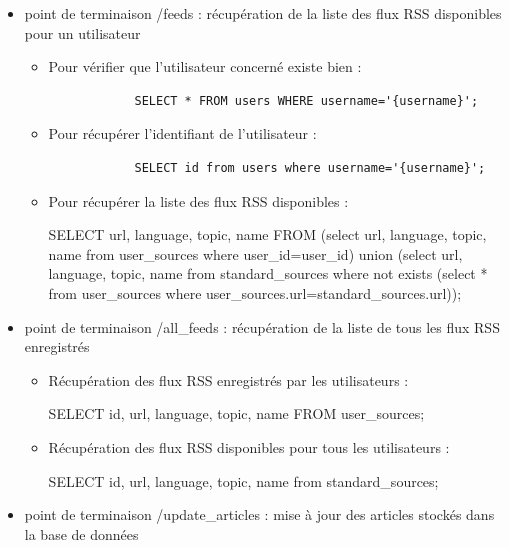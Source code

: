 \documentclass[french]{article}
\begin{document}
    \begin{itemize}
        \label{sec:query}
        \item point de terminaison /feeds : récupération de la liste des flux RSS disponibles pour un utilisateur
        \begin{itemize}
            \item Pour vérifier que l'utilisateur concerné existe bien :
            \begin{verbatim}
            SELECT * FROM users WHERE username='{username}';
            \end{verbatim}
            \item Pour récupérer l'identifiant de l'utilisateur :
            \begin{verbatim}
            SELECT id from users where username='{username}';
            \end{verbatim}
            \item Pour récupérer la liste des flux RSS disponibles :
            \begin{spverbatim}
            SELECT url, language, topic, name FROM (select url, language, topic, name from user_sources where user_id={user_id}) union  (select url, language, topic, name from standard_sources where not exists (select * from user_sources where user_sources.url=standard_sources.url));
            \end{spverbatim}
        \end{itemize}
        \item point de terminaison /all\_feeds : récupération de la liste de tous les flux RSS enregistrés
        \begin{itemize}
            \item Récupération des flux RSS enregistrés par les utilisateurs :
            \begin{spverbatim}
            SELECT id, url, language, topic, name FROM user_sources;
            \end{spverbatim}
            \item Récupération des flux RSS disponibles pour tous les utilisateurs :
            \begin{spverbatim}
            SELECT id, url, language, topic, name from standard_sources;
            \end{spverbatim}
        \end{itemize}
        \item point de terminaison /update\_articles : mise à jour des articles stockés dans la base de données

\end{itemize}
\end{document}
